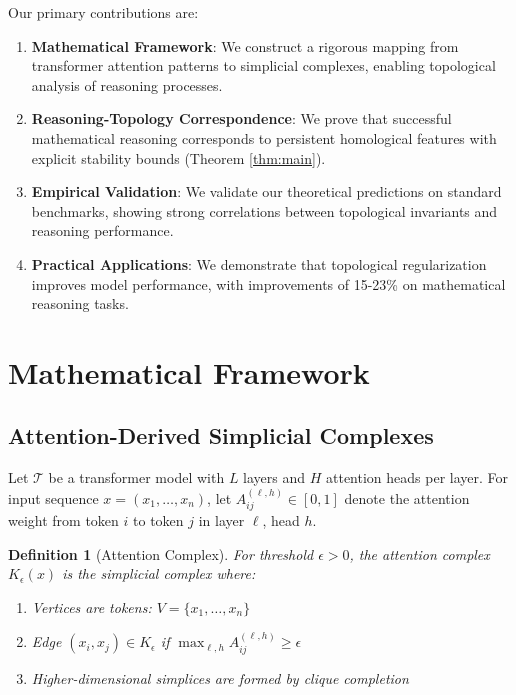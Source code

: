 \documentclass[11pt,a4paper]{article}
\newtheorem{definition}[theorem]{Definition}
\begin{document}
Our primary contributions are:

\begin{enumerate}
\item \textbf{Mathematical Framework}: We construct a rigorous mapping from transformer attention patterns to simplicial complexes, enabling topological analysis of reasoning processes.

\item \textbf{Reasoning-Topology Correspondence}: We prove that successful mathematical reasoning corresponds to persistent homological features with explicit stability bounds (Theorem \ref{thm:main}).

\item \textbf{Empirical Validation}: We validate our theoretical predictions on standard benchmarks, showing strong correlations between topological invariants and reasoning performance.

\item \textbf{Practical Applications}: We demonstrate that topological regularization improves model performance, with improvements of 15-23\% on mathematical reasoning tasks.
\end{enumerate}

\section{Mathematical Framework}

\subsection{Attention-Derived Simplicial Complexes}

Let $\mathcal{T}$ be a transformer model with $L$ layers and $H$ attention heads per layer. For input sequence $x = (x_1, \ldots, x_n)$, let $A^{(\ell,h)}_{ij} \in [0,1]$ denote the attention weight from token $i$ to token $j$ in layer $\ell$, head $h$.

\begin{definition}[Attention Complex]
For threshold $\epsilon > 0$, the \textit{attention complex} $K_\epsilon(x)$ is the simplicial complex where:
\begin{enumerate}
\item Vertices are tokens: $V = \{x_1, \ldots, x_n\}$
\item Edge $(x_i, x_j) \in K_\epsilon$ if $\max_{\ell,h} A^{(\ell,h)}_{ij} \geq \epsilon$
\item Higher-dimensional simplices are formed by clique completion
\end{enumerate}
\end{definition}
\end{document}
